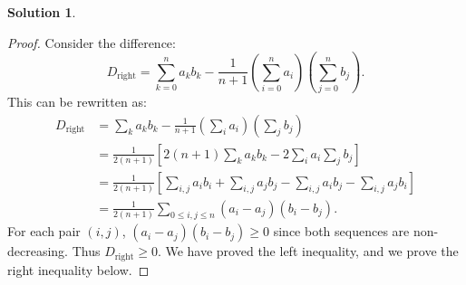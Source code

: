 \documentclass[12pt]{article}
\theoremstyle{definition}
\newtheorem*{solution}{\normalfont\textbf{Solution}}
\begin{document}
\begin{enumerate}[leftmargin=*]
\begin{solution}
\begin{proof}
                Consider the difference:
                \[
                D_{\text{right}} = \sum_{k=0}^n a_k b_k - \frac{1}{n+1} \left( \sum_{i=0}^n a_i \right) \left( \sum_{j=0}^n b_j \right).
                \]
                This can be rewritten as:
                \begin{align*}
                D_{\text{right}} 
                &= \sum_k a_k b_k - \frac{1}{n+1} \left( \sum_i a_i \right) \left( \sum_j b_j \right)\\
                &= \frac{1}{2(n+1)} \left[ 2(n+1) \sum_k a_k b_k - 2 \sum_i a_i \sum_j b_j \right] \\
                &= \frac{1}{2(n+1)} \left[ \sum_{i,j} a_i b_i + \sum_{i,j} a_j b_j - \sum_{i,j} a_i b_j - \sum_{i,j} a_j b_i \right] \\
                &= \frac{1}{2(n+1)} \sum_{0 \leq i,j \leq n} (a_i - a_j)(b_i - b_j).
                \end{align*}
                For each pair $(i,j)$, $(a_i - a_j)(b_i - b_j) \geq 0$ since both sequences are non-decreasing. Thus $D_{\text{right}} \geq 0$.
                We have proved the left inequality, and we prove the right inequality below.   


\end{proof}
\end{solution}
\end{enumerate}
\end{document}
